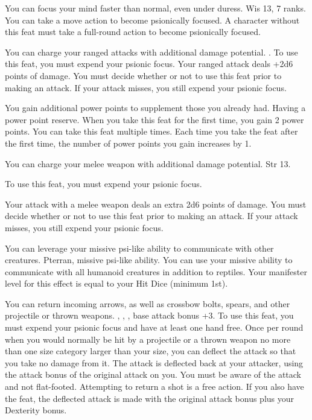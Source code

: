 {You can focus your mind faster than normal, even under duress.}
{Wis 13,  7 ranks.}
{You can take a move action to become psionically focused.}
{A character without this feat must take a full-round action to become psionically focused.}
{}

{You can charge your ranged attacks with additional damage potential.}
{.}
{To use this feat, you must expend your psionic focus. Your ranged attack deals +2d6 points of damage. You must decide whether or not to use this feat prior to making an attack. If your attack misses, you still expend your psionic focus.}
{}{}

{You gain additional power points to supplement those you already had.}
{Having a power point reserve.}
{When you take this feat for the first time, you gain 2 power points.}
{}
{You can take this feat multiple times. Each time you take the feat after the first time, the number of power points you gain increases by 1.}

{You can charge your melee weapon with additional damage potential.}
{Str 13.}
{To use this feat, you must expend your psionic focus.

Your attack with a melee weapon deals an extra 2d6 points of damage. You must decide whether or not to use this feat prior to making an attack. If your attack misses, you still expend your psionic focus.}
{}{}

{You can leverage your missive psi-like ability to communicate with other creatures.}
{Pterran, missive psi-like ability.}
{You can use your missive ability to communicate with all humanoid creatures in addition to reptiles. Your manifester level for this effect is equal to \onehalf your Hit Dice (minimum 1st).}
{}{}

{You can return incoming arrows, as well as crossbow bolts, spears, and other projectile or thrown weapons.}
{, , , base attack bonus +3.}
{To use this feat, you must expend your psionic focus and have at least one hand free. Once per round when you would normally be hit by a projectile or a thrown weapon no more than one size category larger than your size, you can deflect the attack so that you take no damage from it. The attack is deflected back at your attacker, using the attack bonus of the original attack on you. You must be aware of the attack and not flat-footed. Attempting to return a shot is a free action.}
{}
{If you also have the  feat, the deflected attack is made with the original attack bonus plus your Dexterity bonus.}

